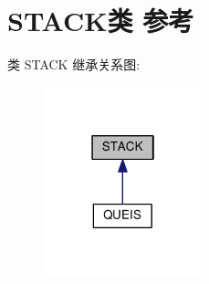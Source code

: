 \hypertarget{classSTACK}{}\section{S\+T\+A\+C\+K类 参考}
\label{classSTACK}


类 S\+T\+A\+CK 继承关系图\+:
\nopagebreak
\begin{figure}[H]
\begin{center}
\leavevmode
\includegraphics[width=130pt]{classSTACK__inherit__graph}
\end{center}
\end{figure}
